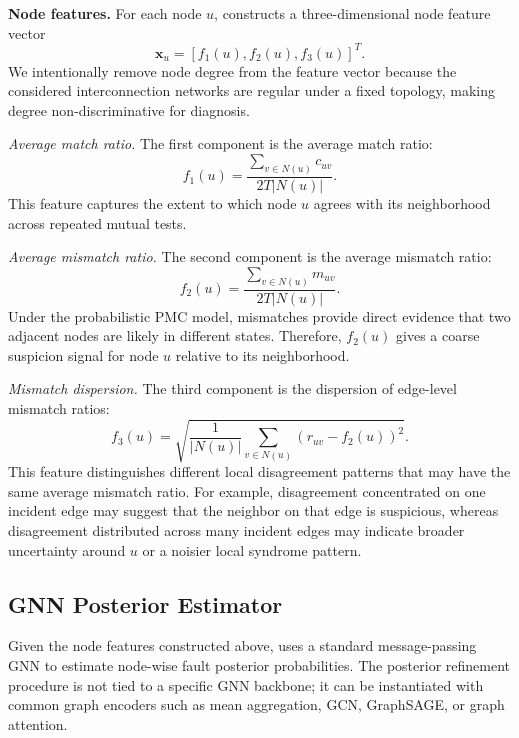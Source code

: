 \noindent\textbf{Node features.}
For each node $u$, \tool constructs a three-dimensional node feature vector
\begin{equation*}
\mathbf{x}_u=[f_1(u),f_2(u),f_3(u)]^T.
\end{equation*}
We intentionally remove node degree from the feature vector because the considered interconnection networks are regular under a fixed topology, making degree non-discriminative for diagnosis.

\noindent\textit{Average match ratio.}
The first component is the average match ratio:
\begin{equation*}
f_1(u)=\frac{\sum_{v\in N(u)}c_{uv}}{2T|N(u)|}.
\end{equation*}
This feature captures the extent to which node $u$ agrees with its neighborhood across repeated mutual tests.

\noindent\textit{Average mismatch ratio.}
The second component is the average mismatch ratio:
\begin{equation*}
f_2(u)=\frac{\sum_{v\in N(u)}m_{uv}}{2T|N(u)|}.
\end{equation*}
Under the probabilistic PMC model, mismatches provide direct evidence that two adjacent nodes are likely in different states. Therefore, $f_2(u)$ gives a coarse suspicion signal for node $u$ relative to its neighborhood.

\noindent\textit{Mismatch dispersion.}
The third component is the dispersion of edge-level mismatch ratios:
\begin{equation*}
f_3(u)=\sqrt{\frac{1}{|N(u)|}\sum_{v\in N(u)}(r_{uv}-f_2(u))^2}.
\end{equation*}
This feature distinguishes different local disagreement patterns that may have the same average mismatch ratio. For example, disagreement concentrated on one incident edge may suggest that the neighbor on that edge is suspicious, whereas disagreement distributed across many incident edges may indicate broader uncertainty around $u$ or a noisier local syndrome pattern.

\subsection{GNN Posterior Estimator}

Given the node features constructed above, \tool uses a standard message-passing GNN to estimate node-wise fault posterior probabilities. The posterior refinement procedure is not tied to a specific GNN backbone; it can be instantiated with common graph encoders such as mean aggregation, GCN, GraphSAGE, or graph attention.

